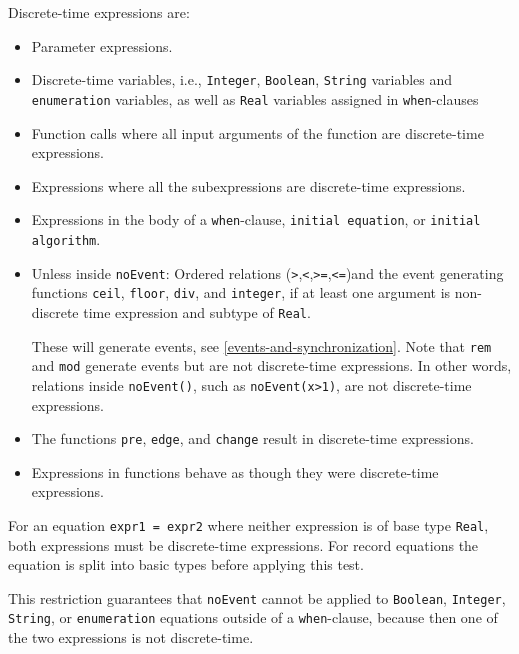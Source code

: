 Discrete-time expressions are:
\begin{itemize}
\item
  Parameter expressions.
\item
  Discrete-time variables, i.e., \lstinline!Integer!, \lstinline!Boolean!, \lstinline!String! variables and
  \lstinline!enumeration! variables, as well as \lstinline!Real! variables assigned in
  \lstinline!when!-clauses
\item
  Function calls where all input arguments of the function are
  discrete-time expressions.
\item
  Expressions where all the subexpressions are discrete-time
  expressions.
\item
  Expressions in the body of a \lstinline!when!-clause, \lstinline!initial equation!, or \lstinline!initial algorithm!.
\item
  Unless inside \lstinline!noEvent!: Ordered relations
  (\lstinline!>!,\lstinline!<!,\lstinline!>=!,\lstinline!<=!)and the event
  generating functions \lstinline!ceil!, \lstinline!floor!, \lstinline!div!, and \lstinline!integer!, if at least one
  argument is non-discrete time expression and subtype of \lstinline!Real!.
  \begin{nonnormative}
  These will generate events, see \autoref{events-and-synchronization}.  Note that \lstinline!rem! and \lstinline!mod! generate events but are not discrete-time
  expressions. In other words, relations inside \lstinline!noEvent()!, such as \lstinline!noEvent(x>1)!, are not discrete-time expressions.
  \end{nonnormative}
\item
  The functions \lstinline!pre!, \lstinline!edge!, and \lstinline!change! result in discrete-time
  expressions.
\item
  Expressions in functions behave as though they were discrete-time
  expressions.
\end{itemize}

For an equation \lstinline!expr1 = expr2! where neither expression is of base type
\lstinline!Real!, both expressions must be discrete-time expressions. For record
equations the equation is split into basic types before applying this
test.

\begin{nonnormative}
This restriction guarantees that \lstinline!noEvent! cannot be applied to \lstinline!Boolean!, \lstinline!Integer!, \lstinline!String!, or \lstinline!enumeration!
equations outside of a \lstinline!when!-clause, because then one of the two expressions is not discrete-time.
\end{nonnormative}

